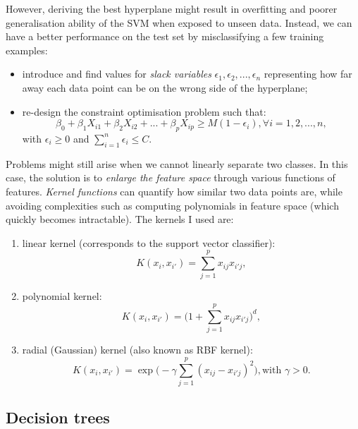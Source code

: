 \documentclass[11pt]{article}
\numberwithin{equation}{section}
\begin{document}
However, deriving the best hyperplane might result in overfitting and poorer generalisation ability of the SVM when exposed to unseen data. Instead, we can have a better performance on the test set by misclassifying a few training examples:
\begin{itemize}
\item introduce and find values for \textit{slack variables} $\epsilon_1, \epsilon_2, ..., \epsilon_n$ representing how far away each data point can be on the wrong side of the hyperplane;
\item re-design the constraint optimisation problem such that:
\begin{equation}
\beta_0 + \beta_1X_{i1} + \beta_2X_{i2} + ... + \beta_pX_{ip} \geq M(1-\epsilon_i), \forall i = 1, 2, ..., n,
\end{equation}
with $\epsilon_i \geq 0$ and $\sum_{i = 1}^{n} \epsilon_i \leq C$.
\end{itemize}

Problems might still arise when we cannot linearly separate two classes. In this case, the solution is to \textit{enlarge the feature space} through various functions of features. \textit{Kernel functions} can quantify how similar two data points are, while avoiding complexities such as computing polynomials in feature space (which quickly becomes intractable). The kernels I used are:
\begin{enumerate}
\item linear kernel (corresponds to the support vector classifier):
\begin{equation}
K(x_i, x_{i'}) = \sum_{j = 1}^{p} x_{ij} x_{i'j},
\end{equation}
\item polynomial kernel:
\begin{equation}
K(x_i, x_{i'}) = \bigg(1 + \sum_{j = 1}^{p} x_{ij} x_{i'j}\bigg)^d,
\end{equation}
\item radial (Gaussian) kernel (also known as RBF kernel):
\begin{equation}
K(x_i, x_{i'}) = \exp\bigg(-\gamma\sum_{j = 1}^{p}(x_{ij} - x_{i'j})^2\bigg), \text{with } \gamma > 0.
\end{equation}
\end{enumerate}

\subsection{Decision trees}
\end{document}
